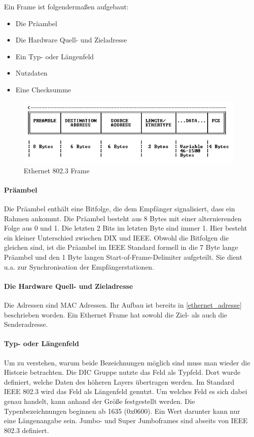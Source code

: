 \documentclass[12pt, a4paper, ngerman]{article}
\begin{document}
Ein Frame ist folgendermaßen aufgebaut:
\begin{itemize}
	\item Die Präambel 
	\item Die Hardware Quell- und Zieladresse
	\item Ein Typ- oder Längenfeld
	\item Nutzdaten
	\item Eine Checksumme
\end{itemize}
\begin{figure}[H]
	\centering
	\includegraphics[width=0.9\linewidth]{Grafiken/ethernet_frame.jpg}
	\caption{Ethernet 802.3 Frame \cite{ethernet_frame}}
	\label{ethernet_frame}
\end{figure}

\paragraph{Präambel}
Die Präambel enthält eine Bitfolge, die dem Empfänger signalisiert, dass ein Rahmen ankommt. Die Präambel besteht aus 8 Bytes mit einer alternierenden Folge aus 0 und 1. Die letzten 2 Bits im letzten Byte sind immer 1. Hier besteht ein kleiner Unterschied zwischen DIX und IEEE. Obwohl die Bitfolgen die gleichen sind, ist die Präambel im IEEE Standard formell in die 7 Byte lange Präambel und den 1 Byte langen Start-of-Frame-Delimiter aufgeteilt.
Sie dient u.a. zur Synchronisation der Empfängerstationen. 

\paragraph{ Die Hardware Quell- und Zieladresse}
Die Adressen sind MAC Adressen. Ihr Aufbau ist bereits in \ref{ethernet_adresse} beschrieben worden. Ein Ethernet Frame hat sowohl die Ziel- als auch die Senderadresse.

\paragraph{Typ- oder Längenfeld}
Um zu verstehen, warum beide Bezeichnungen möglich sind muss man wieder die Historie betrachten. Die DIC Gruppe nutzte das Feld als Typfeld. Dort wurde definiert, welche Daten des höheren Layers übertragen werden.  Im Standard IEEE 802.3 wird das Feld als Längenfeld genutzt. Um welches Feld es sich dabei genau handelt, kann anhand der Größe festgestellt werden. Die Typenbezeichnungen beginnen ab 1635 (0x0600). Ein Wert darunter kann nur eine Längenangabe sein. Jumbo- und Super Jumboframes sind abseits von IEEE 802.3 definiert.
\end{document}
